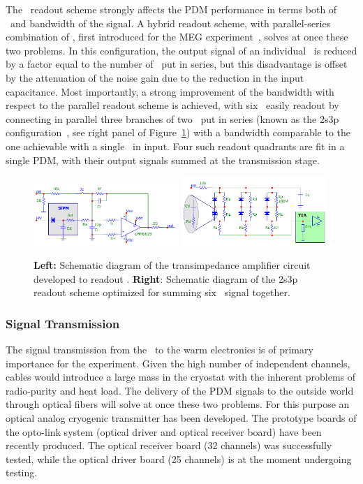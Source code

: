 The \SiPMs\ readout scheme strongly affects the PDM performance in terms both of \SNR\ and bandwidth of the signal. A hybrid readout scheme, with parallel-series combination of \SiPMs,  first introduced for the MEG experiment~\cite{Ootani:2013cn,Cattaneo:2016dq}, solves at once these two problems. In this configuration, the output signal of an individual \SiPM\ is reduced by a factor equal to the number of \SiPMs\ put in series, but this disadvantage is offset by the attenuation of the noise gain due to the reduction in the input capacitance. Most importantly, a strong improvement of the bandwidth with respect to the parallel readout scheme is achieved, with six \SiPMs\ easily readout by connecting in parallel three branches of two \SiPMs\ put in series (known as the 2s3p configuration~\cite{DIncecco:2018hy}, see right panel of Figure~\ref{fig:TIA+2s3p}) with a bandwidth comparable to the one achievable with a single \SiPM\ in input. Four such readout quadrants are fit in a single PDM, with their output signals summed at the transmission stage.

\begin{figure}[t!]
\includegraphics[width=0.49\textwidth]{./Figures/tia-schem.pdf}
\includegraphics[width=0.49\textwidth]{./Figures/2s3p-schem.pdf}
\caption[Schematic of the transimpedance amplified and summing circuits]{{\bf Left:}  Schematic diagram of the transimpedance amplifier circuit developed to  readout \SiPMs.  {\bf Right}: Schematic diagram of the 2s3p readout scheme optimized for summing six \SiPM\ signal together.}
\label{fig:TIA+2s3p}
\end{figure}


\subsubsection{Signal Transmission}

The signal transmission from the \DSkPdms\ to the warm electronics is of primary importance for the experiment. Given the high number of independent channels, cables would introduce a large mass in the cryostat with the inherent problems of radio-purity and heat load. The delivery of the PDM signals to the outside world through optical fibers will solve at once these two problems. For this purpose an optical analog cryogenic transmitter has been developed. The prototype boards of the opto-link system (optical driver and optical receiver board) have been recently produced. The optical receiver board (32 channels) was successfully tested, while the optical driver board (25 channels) is at the moment undergoing testing.

